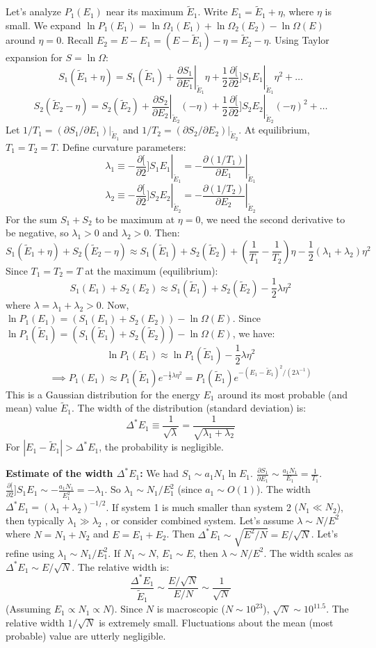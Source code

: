 \documentclass[11pt]{article}
\newcommand{\pderiv}[2]{\frac{\partial #1}{\partial #2}}
\newcommand{\tE}{\tilde{E}} %
\begin{document}
Let's analyze $P_1(E_1)$ near its maximum $\tE_1$. Write $E_1 = \tE_1 + \eta$, where $\eta$ is small.
We expand $\ln P_1(E_1) = \ln \Omega_1(E_1) + \ln \Omega_2(E_2) - \ln \Omega(E)$ around $\eta=0$.
Recall $E_2 = E-E_1 = (E-\tE_1) - \eta = \tE_2 - \eta$.
Using Taylor expansion for $S = \ln \Omega$:
\[ S_1(\tE_1 + \eta) = S_1(\tE_1) + \left.\pderiv{S_1}{E_1}\right|_{\tE_1} \eta + \frac{1}{2} \left.\pderiv[2]{S_1}{E_1}\right|_{\tE_1} \eta^2 + \dots \]
\[ S_2(\tE_2 - \eta) = S_2(\tE_2) + \left.\pderiv{S_2}{E_2}\right|_{\tE_2} (-\eta) + \frac{1}{2} \left.\pderiv[2]{S_2}{E_2}\right|_{\tE_2} (-\eta)^2 + \dots \]
Let $1/T_1 = (\partial S_1/\partial E_1)|_{\tE_1}$ and $1/T_2 = (\partial S_2/\partial E_2)|_{\tE_2}$. At equilibrium, $T_1=T_2=T$.
Define curvature parameters:
\[ \lambda_1 \equiv - \left.\pderiv[2]{S_1}{E_1}\right|_{\tE_1} = - \left.\pderiv{(1/T_1)}{E_1}\right|_{\tE_1} \]
\[ \lambda_2 \equiv - \left.\pderiv[2]{S_2}{E_2}\right|_{\tE_2} = - \left.\pderiv{(1/T_2)}{E_2}\right|_{\tE_2} \]
For the sum $S_1+S_2$ to be maximum at $\eta=0$, we need the second derivative to be negative, so $\lambda_1 > 0$ and $\lambda_2 > 0$.
Then:
\[ S_1(\tE_1 + \eta) + S_2(\tE_2 - \eta) \approx S_1(\tE_1) + S_2(\tE_2) + \left(\frac{1}{T_1} - \frac{1}{T_2}\right)\eta - \frac{1}{2}(\lambda_1 + \lambda_2)\eta^2 \]
Since $T_1=T_2=T$ at the maximum (equilibrium):
\[ S_1(E_1) + S_2(E_2) \approx S_1(\tE_1) + S_2(\tE_2) - \frac{1}{2}\lambda \eta^2 \]
where $\lambda = \lambda_1 + \lambda_2 > 0$.
Now, $\ln P_1(E_1) = (S_1(E_1) + S_2(E_2)) - \ln \Omega(E)$.
Since $\ln P_1(\tE_1) = (S_1(\tE_1) + S_2(\tE_2)) - \ln \Omega(E)$, we have:
\[ \ln P_1(E_1) \approx \ln P_1(\tE_1) - \frac{1}{2}\lambda \eta^2 \]
\[ \implies P_1(E_1) \approx P_1(\tE_1) e^{-\frac{1}{2}\lambda \eta^2} = P_1(\tE_1) e^{-(E_1-\tE_1)^2 / (2 \lambda^{-1})} \]
This is a Gaussian distribution for the energy $E_1$ around its most probable (and mean) value $\tE_1$.
The width of the distribution (standard deviation) is:
\[ \Delta^* E_1 \equiv \frac{1}{\sqrt{\lambda}} = \frac{1}{\sqrt{\lambda_1 + \lambda_2}} \]
For $|E_1 - \tE_1| > \Delta^* E_1$, the probability is negligible.

\textbf{Estimate of the width $\Delta^* E_1$:}
We had $S_1 \sim a_1 N_1 \ln E_1$.
$\pderiv{S_1}{E_1} \sim \frac{a_1 N_1}{E_1} = \frac{1}{T_1}$.
$\pderiv[2]{S_1}{E_1} \sim - \frac{a_1 N_1}{E_1^2} = -\lambda_1$. So $\lambda_1 \sim N_1/E_1^2$ (since $a_1 \sim O(1)$).
The width $\Delta^* E_1 = (\lambda_1 + \lambda_2)^{-1/2}$. If system 1 is much smaller than system 2 ($N_1 \ll N_2$), then typically $\lambda_1 \gg \lambda_2$ , or consider combined system. Let's assume $\lambda \sim N/E^2$ where $N=N_1+N_2$ and $E=E_1+E_2$.
Then $\Delta^* E_1 \sim \sqrt{E^2/N} = E/\sqrt{N}$.
Let's refine using $\lambda_1 \sim N_1/E_1^2$. If $N_1 \sim N$, $E_1 \sim E$, then $\lambda \sim N/E^2$.
The width scales as $\Delta^* E_1 \sim E/\sqrt{N}$.
The relative width is:
\[ \frac{\Delta^* E_1}{\tE_1} \sim \frac{E/\sqrt{N}}{E/N} \sim \frac{1}{\sqrt{N}} \]
(Assuming $E_1 \propto N_1 \propto N$).
Since $N$ is macroscopic ($N \sim 10^{23}$), $\sqrt{N} \sim 10^{11.5}$. The relative width $1/\sqrt{N}$ is extremely small.
Fluctuations about the mean (most probable) value are utterly negligible.
\end{document}
